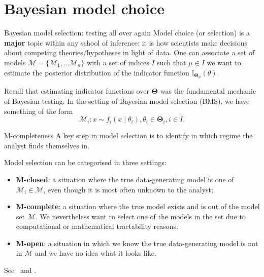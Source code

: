 \section{Bayesian model choice}
\begin{frame}{Bayesian model selection: testing all over again}
 Model choice (or selection) is a \textbf{major} topic within any school of inference: it is how scientists make decisions about competing theories/hypotheses in light of data.
 One can associate a set of models $\boldsymbol{\mathcal{M}} = \{ \mathcal{M}_1, \ldots \mathcal{M}_n \}$ with a set of indices $I$ such that $\mu \in I$ we want to estimate the posterior distribution of the indicator function $\mathbb{I}_{\boldsymbol{\Theta}_\mu}(\theta)$.
 
 Recall that estimating indicator functions over $\boldsymbol{\Theta}$ was the fundamental mechanic of Bayesian testing.
 In the setting of Bayesian model selection (BMS), we have something of the form
 \begin{equation*}
  \mathcal{M}_i : x \sim f_i(x \mid \theta_i), \theta_i \in \boldsymbol{\Theta}_i, i \in I.
 \end{equation*}
\end{frame}
\begin{frame}{M-completeness}
A key step in model selection is to identify in which regime the analyst finds themselves in.
\begin{defn}
 \label{def:m-open}
 Model selection can be categorised in three settings:
 \begin{itemize}
  \item \textbf{M-closed}: a situation where the true data-generating model is one of $\mathcal{M}_i \in \boldsymbol{\mathcal{M}}$, even though  it is most often  unknown to the  analyst;
  \item \textbf{M-complete}: a situation where the true model exists and is out of the model set $\boldsymbol{\mathcal{M}}$.
  We nevertheless want to select one of the models in the set due to computational or mathematical tractability reasons.
  \item \textbf{M-open}: a situation in which we know the true data-generating model is not in $\boldsymbol{\mathcal{M}}$ and we have no idea what it looks like.
 \end{itemize}
\end{defn}
See~\cite{Bernardo2000} and \cite{Yao2018}.
\end{frame}
